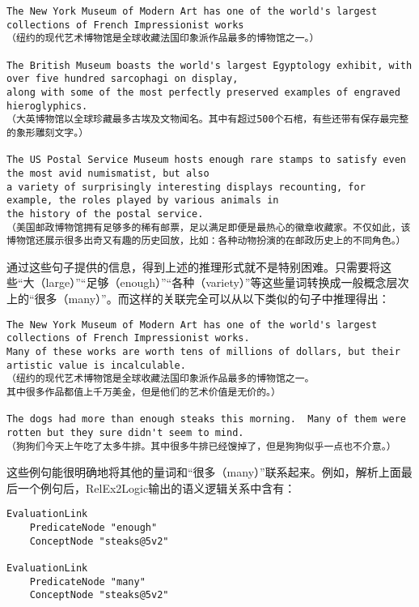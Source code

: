 \begin{verbatim}
The New York Museum of Modern Art has one of the world's largest collections of French Impressionist works
（纽约的现代艺术博物馆是全球收藏法国印象派作品最多的博物馆之一。）

The British Museum boasts the world's largest Egyptology exhibit, with over five hundred sarcophagi on display,
along with some of the most perfectly preserved examples of engraved hieroglyphics.
（大英博物馆以全球珍藏最多古埃及文物闻名。其中有超过500个石棺，有些还带有保存最完整的象形雕刻文字。）

The US Postal Service Museum hosts enough rare stamps to satisfy even the most avid numismatist, but also
a variety of surprisingly interesting displays recounting, for example, the roles played by various animals in
the history of the postal service.
（美国邮政博物馆拥有足够多的稀有邮票，足以满足即便是最热心的徽章收藏家。不仅如此，该博物馆还展示很多出奇又有趣的历史回放，比如：各种动物扮演的在邮政历史上的不同角色。）

\end{verbatim}

\noindent 通过这些句子提供的信息，得到上述的推理形式就不是特别困难。只需要将这些“大（large）”“足够（enough）”“各种（variety）”等这些量词转换成一般概念层次上的“很多（many）”。而这样的关联完全可以从以下类似的句子中推理得出：

\begin{verbatim}
The New York Museum of Modern Art has one of the world's largest collections of French Impressionist works.
Many of these works are worth tens of millions of dollars, but their artistic value is incalculable.
（纽约的现代艺术博物馆是全球收藏法国印象派作品最多的博物馆之一。
其中很多作品都值上千万美金，但是他们的艺术价值是无价的。）

The dogs had more than enough steaks this morning.  Many of them were rotten but they sure didn't seem to mind.
（狗狗们今天上午吃了太多牛排。其中很多牛排已经馊掉了，但是狗狗似乎一点也不介意。）
\end{verbatim}

\noindent 这些例句能很明确地将其他的量词和“很多（many）”联系起来。例如，解析上面最后一个例句后，RelEx2Logic输出的语义逻辑关系中含有：


 {\tt\begin{small}\begin{lstlisting}
EvaluationLink
	PredicateNode "enough"
	ConceptNode "steaks@5v2"
	
EvaluationLink
	PredicateNode "many"
	ConceptNode "steaks@5v2"
\end{lstlisting}\end{small}}

